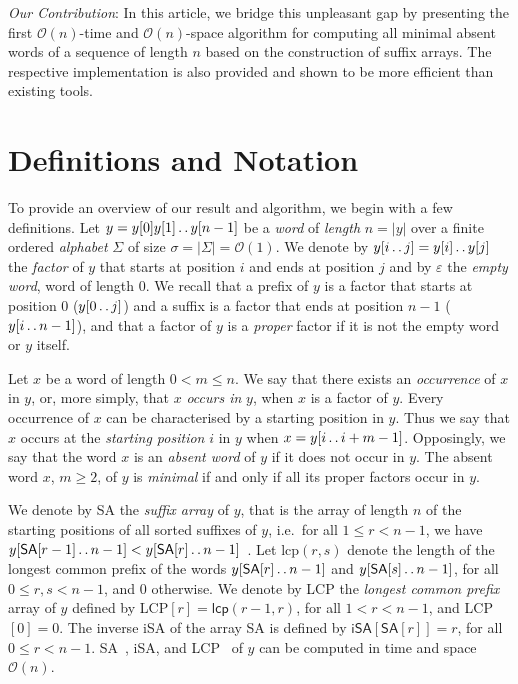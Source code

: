 \documentclass{llncs}
\def\dd{\mathinner{.\,.}}
\newcommand{\cO}{\mathcal{O}}
\newcommand{\SA}{\textsf{SA}}
\newcommand{\iSA}{\textsf{iSA}}
\newcommand{\LCP}{\textsf{LCP}}
\newcommand{\lcp}{\textsf{lcp}}
\begin{document}
  \noindent \textit{Our Contribution}: In this article, we bridge this unpleasant gap by presenting the first $\cO(n)$-time and $\cO(n)$-space algorithm for computing all minimal absent words of a sequence of length $n$ 
  based on the construction of suffix arrays. The respective implementation is also provided and shown to be more efficient than existing tools.
\section{Definitions and Notation}
  To provide an overview of our result and algorithm, we begin with a few
definitions.
  Let $y=y[0]y[1]\dd y[n-1]$ be a \textit{word} of \textit{length} $n=|y|$
over a finite ordered \textit{alphabet} $\Sigma$ of size 
$\sigma = |\Sigma|=\cO(1)$.
  We denote by $y[i\dd j]=y[i]\dd y[j]$ the \textit{factor} of $y$ that 
starts at position $i$ and ends at position $j$ and by $\varepsilon$ 
the \textit{empty word}, word of length 0. 
  We recall that a prefix of $y$ is a factor that starts at position 0 
($y[0\dd j]$) and a suffix is a factor that ends at position $n-1$ 
($y[i\dd n-1]$), and that a factor of $y$ is a \textit{proper} factor if 
it is not the empty word or $y$ itself.

  Let $x$ be a word of length $0<m\leq n$. 
  We say that there exists an \textit{occurrence} of $x$ in $y$, or, more 
simply, that $x$ \textit{occurs in} $y$, when $x$ is a factor of $y$.
  Every occurrence of $x$ can be characterised by a starting position in $y$. 
  Thus we say that $x$ occurs at the \textit{starting position} $i$ in $y$ 
when $x=y[i \dd i + m - 1]$.
  Opposingly, we say that the word $x$ is an \textit{absent word} of
$y$ if it does not occur in $y$.
  The absent word $x$, $m \geq 2$, of $y$ is \textit{minimal} if and only if all its proper factors 
occur in $y$.

  We denote by \SA{} the {\em suffix array} of $y$, that is the array of length $n$
of the starting positions of all sorted suffixes of $y$, i.e.~for all 
$1 \leq  r < n-1$, we have $y[\SA{}[r-1] \dd n-1] < y[\SA{}[r] \dd n - 1]$~\cite{SA}.
  Let \lcp{}$(r, s)$ denote the length of the longest common prefix of
the words $y[\SA{}[r] \dd n - 1]$ and $y[\SA{}[s] \dd n - 1]$, 
for all $0 \leq r,s < n-1$, and $0$ otherwise.
  We denote by \LCP{} the {\em longest common prefix} array of $y$ defined by 
\LCP{}$[r]=\lcp{}(r-1, r)$, for all $1 < r < n-1$, and 
\LCP{}$[0] = 0$. The inverse \iSA{} of the array \SA{} is defined by 
$\iSA{}[\SA{}[r]] = r$, for all $0 \leq r < n-1$.
  \SA{}~\cite{Nong:2009:LSA:1545013.1545570}, \iSA{}, and 
\LCP{}~\cite{indLCP} of $y$ can be computed in time and space $\cO(n)$.
\end{document}

